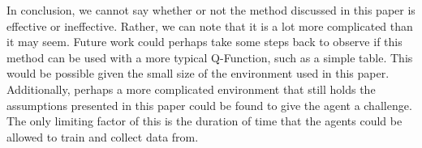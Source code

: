 \documentclass[12pt,letterpaper]{article}
\begin{document}
In conclusion, we cannot say whether or not the method discussed in this paper is effective or ineffective.
Rather, we can note that it is a lot more complicated than it may seem.
Future work could perhaps take some steps back to observe if this method can be used with a more typical Q-Function, such as a simple table.
This would be possible given the small size of the environment used in this paper.
Additionally, perhaps a more complicated environment that still holds the assumptions presented in this paper could be found to give the agent a challenge.
The only limiting factor of this is the duration of time that the agents could be allowed to train and collect data from.

\newpage


\end{document}
